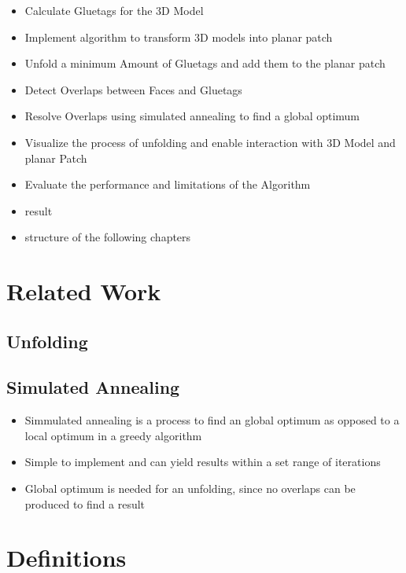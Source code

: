 \documentclass[draft,final]{vutinfth} %
\begin{document}
\begin{itemize}
	\item Calculate Gluetags for the 3D Model
	\item Implement algorithm to transform 3D models into planar patch
	\item Unfold a minimum Amount of Gluetags and add them to the planar patch
	\item Detect Overlaps between Faces and Gluetags
	\item Resolve Overlaps using simulated annealing to find a global optimum
	\item Visualize the process of unfolding and enable interaction with 3D Model and planar Patch
	\item Evaluate the performance and limitations of the Algorithm
\end{itemize}

\begin{itemize}
	\item result
\end{itemize}

\begin{itemize}
	\item structure of the following chapters
\end{itemize}

\chapter{Related Work}

\section{Unfolding}

\section{Simulated Annealing}

\begin{itemize}
	\item Simmulated annealing is a process to find an global optimum as opposed to a local optimum in a greedy algorithm
	\item Simple to implement and can yield results within a set range of iterations
	\item Global optimum is needed for an unfolding, since no overlaps can be produced to find a result
\end{itemize}

\chapter{Definitions}
\end{document}
